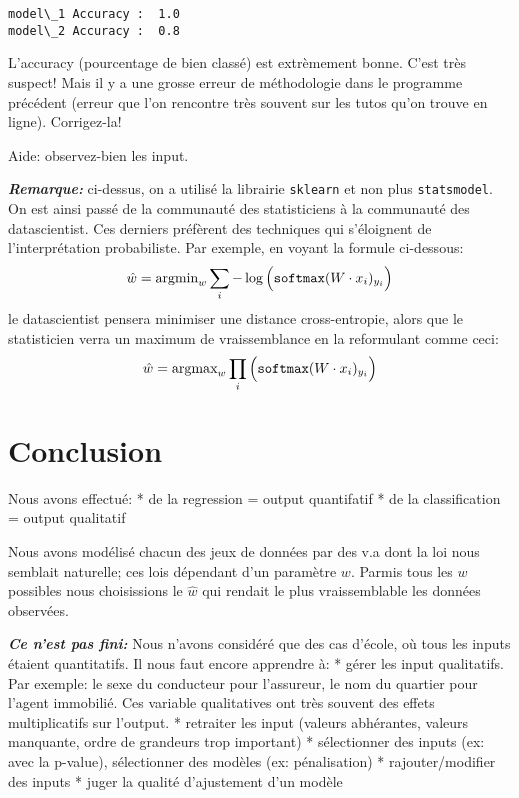 \documentclass[11pt]{article}
\begin{document}
    \begin{Verbatim}[commandchars=\\\{\}]
model\_1 Accuracy :  1.0
model\_2 Accuracy :  0.8

    \end{Verbatim}

    L'accuracy (pourcentage de bien classé) est extrèmement bonne. C'est
très suspect! Mais il y a une grosse erreur de méthodologie dans le
programme précédent (erreur que l'on rencontre très souvent sur les
tutos qu'on trouve en ligne). Corrigez-la!

Aide: observez-bien les input.

    \textbf{\emph{Remarque:}} ci-dessus, on a utilisé la librairie
\texttt{sklearn} et non plus \texttt{statsmodel}. On est ainsi passé de
la communauté des statisticiens à la communauté des datascientist. Ces
derniers préfèrent des techniques qui s'éloignent de l'interprétation
probabiliste. Par exemple, en voyant la formule ci-dessous: \[
\hat w  = \hbox{argmin}_w  \sum_i -\log   \Big (  \verb IsoftmaxI (W\cdot x_i)  _{y_i}    \Big)
\] le datascientist pensera minimiser une distance cross-entropie, alors
que le statisticien verra un maximum de vraissemblance en la reformulant
comme ceci: \[
\hat w  = \hbox{argmax}_w  \prod_i    \Big (  \verb IsoftmaxI (W\cdot x_i)  _{y_i}    \Big)
\]

    \hypertarget{conclusion}{%
\section{Conclusion}\label{conclusion}}

Nous avons effectué: * de la regression = output quantifatif * de la
classification = output qualitatif

Nous avons modélisé chacun des jeux de données par des v.a dont la loi
nous semblait naturelle; ces lois dépendant d'un paramètre \(w\). Parmis
tous les \(w\) possibles nous choisissions le \(\hat w\) qui rendait le
plus vraissemblable les données observées.

\textbf{\emph{Ce n'est pas fini:}} Nous n'avons considéré que des cas
d'école, où tous les inputs étaient quantitatifs. Il nous faut encore
apprendre à: * gérer les input qualitatifs. Par exemple: le sexe du
conducteur pour l'assureur, le nom du quartier pour l'agent immobilié.
Ces variable qualitatives ont très souvent des effets multiplicatifs sur
l'output. * retraiter les input (valeurs abhérantes, valeurs manquante,
ordre de grandeurs trop important) * sélectionner des inputs (ex: avec
la p-value), sélectionner des modèles (ex: pénalisation) *
rajouter/modifier des inputs * juger la qualité d'ajustement d'un modèle
\end{document}
